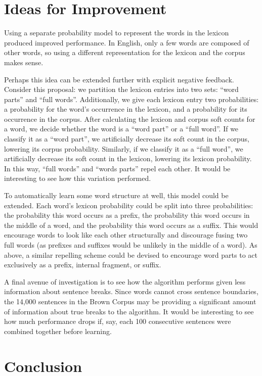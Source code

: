 \documentclass[11pt, oneside, fleqn]{article}
\begin{document}
  \section{Ideas for Improvement}

  Using a separate probability model to represent the words in the lexicon produced improved performance. In English, only a few words are composed of other words, so using a different representation for the lexicon and the corpus makes sense.
  
  Perhaps this idea can be extended further with explicit negative feedback. Consider this proposal: we partition the lexicon entries into two sets: ``word parts'' and ``full words''. Additionally, we give each lexicon entry two probabilities: a probability for the word's occurrence in the lexicon, and a probability for its occurrence in the corpus.  After calculating the lexicon and corpus soft counts for a word, we decide whether the word is a ``word part'' or a ``full word''. If we classify it as a ``word part'', we artificially decrease its soft count in the corpus, lowering its corpus probability. Similarly, if we classify it as a ``full word'', we artificially decrease its soft count in the lexicon, lowering its lexicon probability. In this way, ``full words'' and ``words parts'' repel each other. It would be interesting to see how this variation performed.

	To automatically learn some word structure at well, this model could be extended. Each word's lexicon probability could be split into three probabilities: the probability this word occurs as a prefix, the probability this word occurs in the middle of a word, and the probability this word occurs as a suffix. This would encourage words to look like each other structurally and discourage fusing two full words (as prefixes and suffixes would be unlikely in the middle of a word). As above, a similar repelling scheme could be devised to encourage word parts to act exclusively as a prefix, internal fragment, or suffix.

	A final avenue of investigation is to see how the algorithm performs given less information about sentence breaks. Since words cannot cross sentence boundaries, the 14,000 sentences in the Brown Corpus may be providing a significant amount of information about true breaks to the algorithm. It would be interesting to see how much performance drops if, say, each 100 consecutive sentences were combined together before learning.

  \section{Conclusion}
\end{document}
